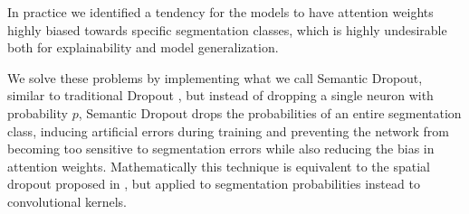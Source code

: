In practice we identified a tendency for the models to have attention
weights highly biased towards specific segmentation classes, which is highly undesirable
both for explainability and model generalization.

We solve these problems by implementing what we call Semantic Dropout, similar to traditional Dropout \cite{srivastava_dropout},
but instead of dropping a single neuron with probability $p$, Semantic Dropout drops the
probabilities of an entire segmentation class, inducing artificial errors
during training and preventing the network from becoming too sensitive to
segmentation errors while also reducing the bias in attention weights. Mathematically
this technique is equivalent to the spatial dropout proposed in ,
but applied to segmentation probabilities instead to convolutional kernels.

